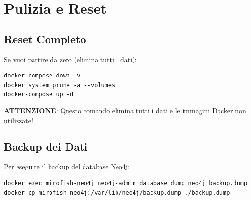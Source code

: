 \section{Pulizia e Reset}

\subsection{Reset Completo}

Se vuoi partire da zero (elimina tutti i dati):

\begin{lstlisting}
docker-compose down -v
docker system prune -a --volumes
docker-compose up -d
\end{lstlisting}

\textbf{ATTENZIONE}: Questo comando elimina tutti i dati e le immagini Docker non utilizzate!

\subsection{Backup dei Dati}

Per eseguire il backup del database Neo4j:

\begin{lstlisting}
docker exec mirofish-neo4j neo4j-admin database dump neo4j backup.dump
docker cp mirofish-neo4j:/var/lib/neo4j/backup.dump ./backup.dump
\end{lstlisting}
